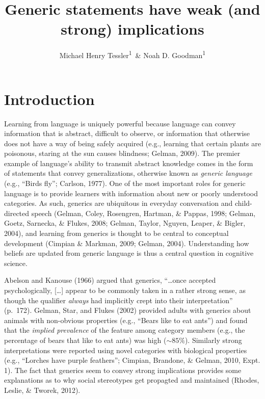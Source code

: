 \documentclass[floatsintext,man]{apa6}
\title{Generic statements have weak (and strong) implications}
\author{Michael Henry Tessler\textsuperscript{1}~\& Noah D. Goodman\textsuperscript{1}}
\affiliation{
    \vspace{0.5cm}
          \textsuperscript{1} Department of Psychology, Stanford University  }
\theoremstyle{definition}
\theoremstyle{definition}
\theoremstyle{definition}
\theoremstyle{remark}
\begin{document}
\maketitle

\setcounter{secnumdepth}{0}



\newcommand{\denote}[1]{\mbox{ $[\![ #1 ]\!]$}}
\newcommand*\diff{\mathop{}\!\mathrm{d}}

 

\newcommand{\mht}[1]{{\textcolor{Blue}{[mht: #1]}}}
\newcommand{\ndg}[1]{{\textcolor{Green}{[ndg: #1]}}}
\newcommand{\red}[1]{{\textcolor{Red}{#1}}}







\section{Introduction}\label{introduction}

Learning from language is uniquely powerful because language can convey
information that is abstract, difficult to observe, or information that
otherwise does not have a way of being safely acquired (e.g., learning
that certain plants are poisonous, staring at the sun causes blindness;
Gelman, 2009). The premier example of language's ability to transmit
abstract knowledge comes in the form of statements that convey
generalizations, otherwise known as \emph{generic language} (e.g.,
``Birds fly''; Carlson, 1977). One of the most important roles for
generic language is to provide learners with information about new or
poorly understood categories. As such, generics are ubiquitous in
everyday conversation and child-directed speech (Gelman, Coley,
Rosengren, Hartman, \& Pappas, 1998; Gelman, Goetz, Sarnecka, \& Flukes,
2008; Gelman, Taylor, Nguyen, Leaper, \& Bigler, 2004), and learning
from generics is thought to be central to conceptual development
(Cimpian \& Markman, 2009; Gelman, 2004). Understanding how beliefs are
updated from generic language is thus a central question in cognitive
science.

Abelson and Kanouse (1966) argued that generics, \enquote{\ldots{}once
accepted psychologically, {[}\ldots{}{]} appear to be commonly taken in
a rather strong sense, as though the qualifier \emph{always} had
implicitly crept into their interpretation} (p.~172). Gelman, Star, and
Flukes (2002) provided adults with generics about animals with
non-obvious properties (e.g., \enquote{Bears like to eat ants}) and
found that the \emph{implied prevalence} of the feature among category
members (e.g., the percentage of bears that like to eat ants) was high
(\(\sim 85\%\)). Similarly strong interpretations were reported using
novel categories with biological properties (e.g., ``Lorches have purple
feathers''; Cimpian, Brandone, \& Gelman, 2010, Expt. 1). The fact that
generics seem to convey strong implications provides some explanations
as to why social stereotypes get propagted and maintained (Rhodes,
Leslie, \& Tworek, 2012).
\end{document}
